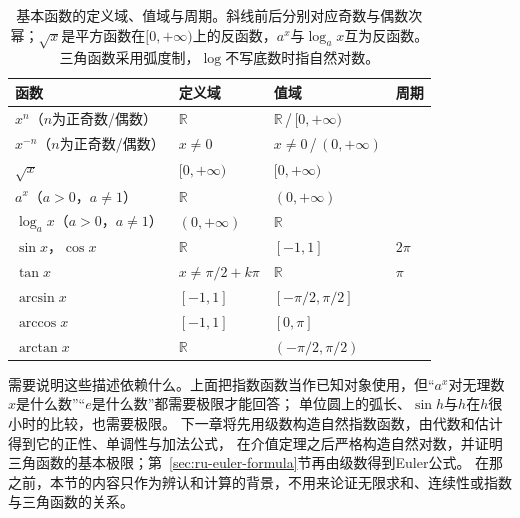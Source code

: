 \begin{table}[htbp]
 \centering\small
 \begin{tabular}{@{}llll@{}}
 \toprule
 函数 & 定义域 & 值域 & 周期\\
 \midrule
 $x^n$（$n$为正奇数/偶数） & $\mathbb R$ & $\mathbb R$\,/\,$[0,+\infty)$ & \\
 $x^{-n}$（$n$为正奇数/偶数） & $x\neq0$ & $x\neq0$\,/\,$(0,+\infty)$ & \\
 $\sqrt x$ & $[0,+\infty)$ & $[0,+\infty)$ & \\
 $a^x$（$a>0$，$a\neq1$） & $\mathbb R$ & $(0,+\infty)$ & \\
 $\log_ax$（$a>0$，$a\neq1$） & $(0,+\infty)$ & $\mathbb R$ & \\
 $\sin x$，$\cos x$ & $\mathbb R$ & $[-1,1]$ & $2\pi$\\
 $\tan x$ & $x\neq\pi/2+k\pi$ & $\mathbb R$ & $\pi$\\
 $\arcsin x$ & $[-1,1]$ & $[-\pi/2,\pi/2]$ & \\
 $\arccos x$ & $[-1,1]$ & $[0,\pi]$ & \\
 $\arctan x$ & $\mathbb R$ & $(-\pi/2,\pi/2)$ & \\
 \bottomrule
 \end{tabular}
 \caption{基本函数的定义域、值域与周期。斜线前后分别对应奇数与偶数次幂；$\sqrt x$是平方函数在$[0,+\infty)$上的反函数，$a^x$与$\log_ax$互为反函数。三角函数采用弧度制，$\log$不写底数时指自然对数。}
 \label{tab:ru-elementary-functions}
\end{table}

需要说明这些描述依赖什么。上面把指数函数当作已知对象使用，但“$a^x$对无理数$x$是什么数”“$e$是什么数”都需要极限才能回答；
单位圆上的弧长、$\sin h$与$h$在$h$很小时的比较，也需要极限。
下一章将先用级数构造自然指数函数，由代数和估计得到它的正性、单调性与加法公式，
在介值定理之后严格构造自然对数，并证明三角函数的基本极限；第~\ref{sec:ru-euler-formula}节再由级数得到Euler公式。
在那之前，本节的内容只作为辨认和计算的背景，不用来论证无限求和、连续性或指数与三角函数的关系。
